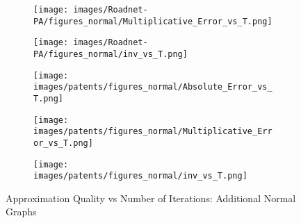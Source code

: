 \begin{figure*}[htbp]
\begin{subfigure}[b]{\textwidth}
\begin{minipage}[b]{0.3\textwidth}
\end{minipage}%
\begin{minipage}[b]{0.3\textwidth}
	\centering
	
	\texttt{[image: images/Roadnet-PA/figures\_normal/Multiplicative\_Error\_vs\_T.png]} %
	
\end{minipage}%
\begin{minipage}[b]{0.3\textwidth}
	\centering
	
	\texttt{[image: images/Roadnet-PA/figures\_normal/inv\_vs\_T.png]} %
\end{minipage}

\end{subfigure}
		\begin{subfigure}[b]{\textwidth}
		\centering
		\begin{minipage}[b]{0.05\textwidth}
			\centering
		\end{minipage}%
		\begin{minipage}[b]{0.3\textwidth}
			\centering
			\texttt{[image: images/patents/figures\_normal/Absolute\_Error\_vs\_T.png]} %
			
		\end{minipage}%
		\begin{minipage}[b]{0.3\textwidth}
			\centering
			
			\texttt{[image: images/patents/figures\_normal/Multiplicative\_Error\_vs\_T.png]} %
			
		\end{minipage}%
		\begin{minipage}[b]{0.3\textwidth}
			\centering
			
			\texttt{[image: images/patents/figures\_normal/inv\_vs\_T.png]} %
		\end{minipage}
		
	\end{subfigure}
	
	\caption{Approximation Quality vs Number of Iterations: Additional Normal Graphs}
	\label{fig:accuracy_iteration_normal_2}
\end{figure*}


